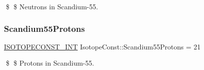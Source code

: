\$ \$ Neutrons in Scandium-\/55. \mbox{\label{group___isotope_const-_scandium-_sc55_gaf81557236c02d2c1d6533b7aa7d4aa06}} 
\subsubsection{\texorpdfstring{Scandium55\+Protons}{Scandium55Protons}}
{\footnotesize\ttfamily \mbox{\hyperlink{group___isotope_const-_macros_ga5f18360b3e99483a35c32d789e62621c}{I\+S\+O\+T\+O\+P\+E\+C\+O\+N\+S\+T\+\_\+\+I\+NT}} Isotope\+Const\+::\+Scandium55\+Protons = 21}

\$ \$ Protons in Scandium-\/55. 